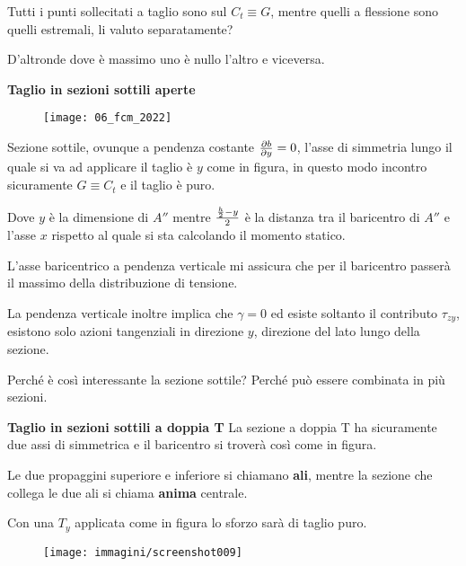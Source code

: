 \documentclass{article}
\begin{document}
\begin{adjustwidth}{2in}{}
		Tutti i punti sollecitati a taglio sono sul $C_t\equiv G$, mentre quelli  a flessione sono quelli estremali, li valuto separatamente? 
		
		D'altronde dove è massimo uno è nullo l'altro e viceversa. \newline 
		
		\textbf{{\Large Taglio in sezioni sottili aperte}}  
\end{adjustwidth}
\begin{figure}[H]
\texttt{[image: 06\_fcm\_2022]}
\end{figure}
\begin{adjustwidth}{2in}{} 

		Sezione sottile, ovunque a pendenza costante \({\partial b\over \partial y} = 0\), l'asse di simmetria lungo il quale si va ad applicare il taglio è $y$ come in figura, in questo modo incontro sicuramente $G\equiv C_t$ e il taglio è puro. \newline		

		Dove $y$ è la dimensione di $A'' $ mentre \( {h\over2} - y \over2\) è la distanza tra il baricentro di $A''$ e l'asse $x$ rispetto al quale si sta calcolando il momento statico. 
		
		L'asse baricentrico a pendenza verticale mi assicura che per il baricentro passerà il massimo della distribuzione di tensione. 
		
		La pendenza verticale inoltre implica che $\gamma=0$ ed esiste soltanto il contributo $\tau_{zy}$, esistono solo azioni tangenziali in direzione $y$, direzione del lato lungo della sezione.  
		
		Perché è così interessante la sezione sottile? Perché può essere combinata in più sezioni.  \newline 
		
\textbf{{\Large Taglio in sezioni sottili a doppia T}} \newline
		La sezione a doppia T ha sicuramente due assi di simmetrica e il baricentro si troverà così come in figura. \newline 
		
		Le due propaggini superiore e inferiore si chiamano \textbf{ali}, mentre la sezione che collega le due ali si chiama \textbf{anima} centrale. \newline 
		
		Con una $T_y$ applicata come in figura lo sforzo sarà di taglio puro.
		
\begin{figure}[H]
	\centering
	\label{fig:screenshot009}
	\texttt{[image: immagini/screenshot009]}
\end{figure}


\end{adjustwidth}
\end{document}
